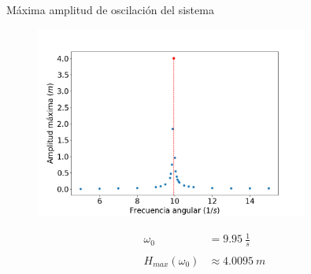 \begin{frame}{Máxima amplitud de oscilación del sistema}
    \begin{minipage}[c]{0.7\linewidth}
        \begin{figure}[H]
            \centering
            \includegraphics[width=0.8\textwidth]{pic/05-results/system_max_amplitude}
            \label{fig:system-max-amplitude}
        \end{figure}
    \end{minipage}
    \begin{minipage}[c]{0.25\linewidth}
        \large{
            \begin{equation*}
                \begin{aligned}
                    \omega_0 &= 9.95\ \frac{1}{s} \\ \\
                    H_{max}(\omega_0) &\approx 4.0095\ m
                \end{aligned}
            \end{equation*}
        }
    \end{minipage}
\end{frame}

